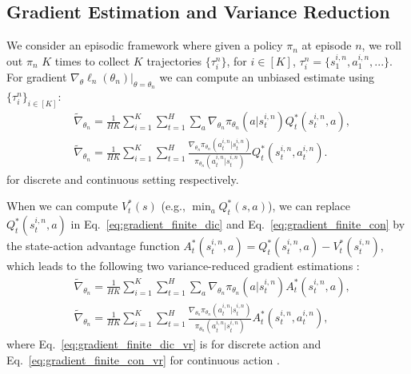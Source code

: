 \documentclass{article}
\begin{document}
\subsection{Gradient Estimation and Variance Reduction}
We consider an episodic framework where given a policy $\pi_n$ at episode $n$, we roll out $\pi_n$ $K$ times to collect $K$ trajectories $\{\tau_i^{n}\}$, for $i\in [K]$, $\tau_i^n=\{s_1^{i,n},a_1^{i,n},...\}$.  For gradient $\nabla_{\theta}\ell_n(\theta_n)|_{\theta=\theta_n}$ %
we can compute an unbiased estimate using $\{\tau_i^n\}_{i\in[K]}$:
\begin{align}
\label{eq:gradient_finite_dic}
&\tilde{\nabla}_{\theta_n} = \frac{1}{HK}\sum_{i=1}^K\sum_{t=1}^H\sum_{a}\nabla_{\theta_n}\pi_{\theta_n}(a|s^{i,n}_t) Q_t^*(s^{i,n}_t, a), \\
&\label{eq:gradient_finite_con}
\tilde{\nabla}_{\theta_n} = \frac{1}{HK}\sum_{i=1}^K\sum_{t=1}^H \frac{\nabla_{\theta_n}\pi_{\theta_n}(a^{i,n}_t|s_t^{i,n})}{\pi_{\theta_n}(a_t^{i,n}|s_t^{i,n})}Q_t^*(s_t^{i,n},a_t^{i,n}).
\end{align} for discrete and  continuous setting respectively. %

When we can compute $V_t^*(s)$ (e.g., $\min_a Q_t^*(s,a)$), we can replace $Q_t^*(s_t^{i,n},a)$ in Eq.~\ref{eq:gradient_finite_dic} and Eq.~\ref{eq:gradient_finite_con} by the state-action advantage function $A^*_t(s_t^{i,n},a) = Q^*_t(s_t^{i,n},a) - V_t^*(s_t^{i,n})$, which leads to the following two variance-reduced gradient estimations \cite{greensmith2004variance}:
\begin{align}
&\tilde{\nabla}_{\theta_n} = \frac{1}{HK}\sum_{i=1}^K\sum_{t=1}^H\sum_{a}\nabla_{\theta_n}\pi_{\theta_n}(a|s^{i,n}_t) A_t^*(s^{i,n}_t, a), \label{eq:gradient_finite_dic_vr}\\
&\tilde{\nabla}_{\theta_n} = \frac{1}{HK}\sum_{i=1}^K\sum_{t=1}^H \frac{\nabla_{\theta_n}\pi_{\theta_n}(a^{i,n}_t|s_t^{i,n})}{\pi_{\theta_n}(a_t^{i,n}|s_t^{i,n})}A_t^*(s_t^{i,n},a_t^{i,n}),
\label{eq:gradient_finite_con_vr}
\end{align} where Eq.~\ref{eq:gradient_finite_dic_vr} is for discrete action and Eq.~\ref{eq:gradient_finite_con_vr} for continuous action . %
\end{document}
